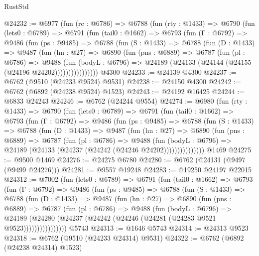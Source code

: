 \begin{lexlean}{RustStd}
\begin{coremodule}
@24232 := @6977
    (fun (rc : @6786) =>
    @6788
      (fun (rty : @1433) =>
      @6790
        (fun (lets0 : @6789) =>
        @6791
          (fun (tail0 : @1662) =>
          @6793
            (fun (Γ : @6792) =>
            @9486
              (fun (ps : @9485) =>
              @6788
                (fun (S : @1433) =>
                @6788
                  (fun (D : @1433) =>
                  @9487
                    (fun (hn : @27) =>
                    @6890
                      (fun (pns : @6889) =>
                      @6787
                        (fun (pl : @6786) =>
                        @9488
                          (fun (bodyL : @6796) =>
                          @24189 (@24133 (@24144 (@24155 (@24196 @24202))))))))))))))))
    @4300
@24233 := @24139 @4300
@24237 := @6762 (@9510 (@24233 @9524) @9531)
@24238 := @24150 @4300
@24242 := @6762 (@6892 (@24238 @9524) @1523)
@24243 := @24192 @16425
@24244 := @6833 @24243
@24246 := @6762 (@24244 @9554)
@24274 := @6980
    (fun (rty : @1433) =>
    @6790
      (fun (lets0 : @6789) =>
      @6791
        (fun (tail0 : @1662) =>
        @6793
          (fun (Γ : @6792) =>
          @9486
            (fun (ps : @9485) =>
            @6788
              (fun (S : @1433) =>
              @6788
                (fun (D : @1433) =>
                @9487
                  (fun (hn : @27) =>
                  @6890
                    (fun (pns : @6889) =>
                    @6787
                      (fun (pl : @6786) =>
                      @9488
                        (fun (bodyL : @6796) =>
                        @24189 (@24133 (@24237 (@24242 (@24246 @24202)))))))))))))))
    @1469
@24275 := @9500 @1469
@24276 := @24275 @6780
@24280 := @6762 (@24131 (@9497 (@9499 @24276)))
@24281 := @9557 @19248
@24283 := @19250 @24197 @22015
@24312 := @7002
    (fun (lets0 : @6789) =>
    @6791
      (fun (tail0 : @1662) =>
      @6793
        (fun (Γ : @6792) =>
        @9486
          (fun (ps : @9485) =>
          @6788
            (fun (S : @1433) =>
            @6788
              (fun (D : @1433) =>
              @9487
                (fun (hn : @27) =>
                @6890
                  (fun (pns : @6889) =>
                  @6787
                    (fun (pl : @6786) =>
                    @9488
                      (fun (bodyL : @6796) =>
                      @24189
                        (@24280 (@24237 (@24242 (@24246 (@24281 (@24283 @9521 @9523))))))))))))))))
    @5743
@24313 := @1646 @5743
@24314 := @24313 @9523
@24318 := @6762 (@9510 (@24233 @24314) @9531)
@24322 := @6762 (@6892 (@24238 @24314) @1523)

\end{coremodule}
\end{lexlean}
